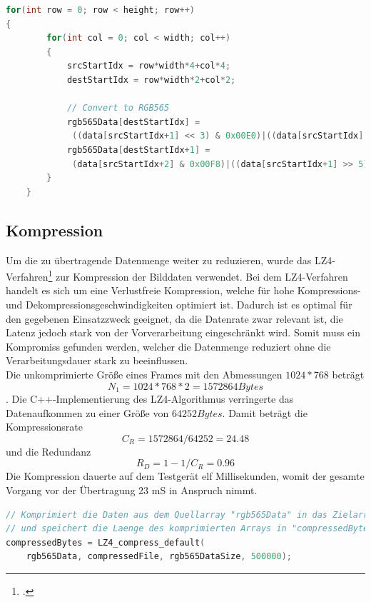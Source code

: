 \begin{lstlisting}[caption=Umwandlung des Pixelformates, label=lst:rgb_conversion, language=C++]
for(int row = 0; row < height; row++)
{
        for(int col = 0; col < width; col++)
        {
            srcStartIdx = row*width*4+col*4;
            destStartIdx = row*width*2+col*2;

            // Convert to RGB565
            rgb565Data[destStartIdx] =
             ((data[srcStartIdx+1] << 3) & 0x00E0)|((data[srcStartIdx] >> 3) & 0x001F);
            rgb565Data[destStartIdx+1] = 
             (data[srcStartIdx+2] & 0x00F8)|((data[srcStartIdx+1] >> 5) & 0x0007);
        }
    }
\end{lstlisting}

\subsection{Kompression}
Um die zu übertragende Datenmenge weiter zu reduzieren, wurde das LZ4-Verfahren\footcite{LZ4} zur Kompression der Bilddaten verwendet. Bei dem LZ4-Verfahren handelt es sich um eine Verlustfreie Kompression, welche für hohe Kompressions- und Dekompressionsgeschwindigkeiten optimiert ist. Dadurch ist es optimal für den gegebenen Einsatzzweck geeignet, da die Datenrate zwar relevant ist, die Latenz jedoch stark von der Vorverarbeitung eingeschränkt wird. Somit muss ein Kompromiss gefunden werden, welcher die Datenmenge reduziert ohne die Verarbeitungsdauer stark zu beeinflussen. \\
Die unkomprimierte Größe eines Frames mit den Abmessungen $1024*768$ beträgt
\begin{equation}
N_1=1024*768*2=1572864 Bytes
\end{equation}.
Die C++-Implementierung des LZ4-Algorithmus verringerte das Datenaufkommen zu einer Größe von $64252 Bytes$. Damit beträgt die Kompressionsrate 
\begin{equation}
C_R=1572864/64252=24.48
\end{equation}
und die Redundanz
\begin{equation}
R_D=1-1/C_R=0.96
\end{equation}
Die Kompression dauerte auf dem Testgerät elf Millisekunden, womit der gesamte Vorgang vor der Übertragung 23 mS in Anspruch nimmt.

\begin{lstlisting}[caption=Kompression der Rohdaten, label=lst:compression, language=C++]
// Komprimiert die Daten aus dem Quellarray "rgb565Data" in das Zielarray "compressedFile"
// und speichert die Laenge des komprimierten Arrays in "compressedBytes"
compressedBytes = LZ4_compress_default(
	rgb565Data, compressedFile, rgb565DataSize, 500000);
\end{lstlisting}

